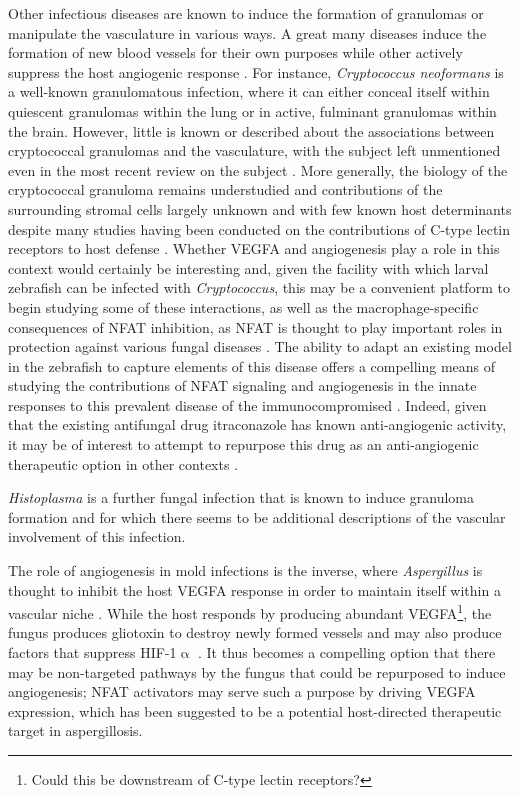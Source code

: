 Other infectious diseases are known to induce the formation of granulomas or manipulate the vasculature in various ways. A great many diseases induce the formation of new blood vessels for their own purposes while other actively suppress the host angiogenic response \citep{Osherov2016}. For instance, \textit{Cryptococcus neoformans} is a well-known granulomatous infection, where it can either conceal itself within quiescent granulomas within the lung or in active, fulminant granulomas within the brain. However, little is known or described about the associations between cryptococcal granulomas and the vasculature, with the subject left unmentioned even in the most recent review on the subject \citep{Ristow2021}. More generally, the biology of the cryptococcal granuloma remains understudied and contributions of the surrounding stromal cells largely unknown and with few known host determinants despite many studies having been conducted on the contributions of C-type lectin receptors to host defense \citep{Campuzano2017}. Whether VEGFA and angiogenesis play a role in this context would certainly be interesting and, given the facility with which larval zebrafish can be infected with \textit{Cryptococcus}, this may be a convenient platform to begin studying some of these interactions, as well as the macrophage-specific consequences of NFAT inhibition, as NFAT is thought to play important roles in protection against various fungal diseases \citep{Tenor2015, Davis2016, Greenblatt2010, Goodridge2007, Bojarczuk2016}. The ability to adapt an existing model in the zebrafish to capture elements of this disease offers a compelling means of studying the contributions of NFAT signaling and angiogenesis in the innate responses to this prevalent disease of the immunocompromised \citep{Lin2006b}. Indeed, given that the existing antifungal drug itraconazole has known anti-angiogenic activity, it may be of interest to attempt to repurpose this drug as an anti-angiogenic therapeutic option in other contexts \citep{Nacev2011}.

\textit{Histoplasma} is a further fungal infection that is known to induce granuloma formation and for which there seems to be additional descriptions of the vascular involvement of this infection. 

The role of angiogenesis in mold infections is the inverse, where \textit{Aspergillus} is thought to inhibit the host VEGFA response in order to maintain itself within a vascular niche \citep{Kontoyiannis2010}. While the host responds by producing abundant VEGFA\footnote{Could this be downstream of C-type lectin receptors?}, the fungus produces gliotoxin to destroy newly formed vessels and may also produce factors that suppress HIF-1$\upalpha$ \citep{BenAmi2013}. It thus becomes a compelling option that there may be non-targeted pathways by the fungus that could be repurposed to induce angiogenesis; NFAT activators may serve such a purpose by driving VEGFA expression, which has been suggested to be a potential host-directed therapeutic target in aspergillosis.

